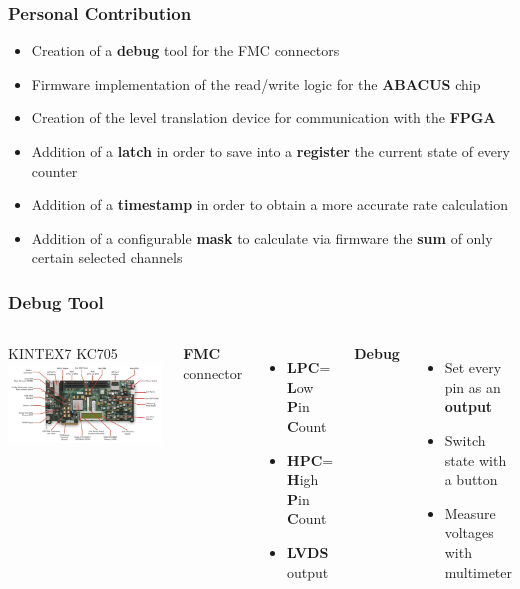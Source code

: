 \documentclass[aspectratio=169]{beamer}
\begin{document}
	
	\begin{frame}
	\frametitle{Personal Contribution}
	\begin{itemize}
		\item {\color{green} Creation of a \textbf{debug} tool for the FMC connectors}
		\item {\color{green} Firmware implementation of the read/write logic for the \textbf{ABACUS} chip}
		\item {\color{green} Creation of the level translation device for communication with the \textbf{FPGA}}
		\item {\color{orange} Addition of a \textbf{latch} in order to save into a \textbf{register} the current state of every counter}
		\item {\color{orange} Addition of a \textbf{timestamp} in order to obtain a more accurate rate calculation}
		\item {\color{orange} Addition of a configurable \textbf{mask} to calculate via firmware the \textbf{sum} of only certain selected channels}
	\end{itemize}
	\end{frame}
	
	\begin{frame}
		\frametitle{Debug Tool}
		\begin{columns}
			\column{0.5 \textwidth}
			\begin{center}
				{\color{blue} KINTEX7 KC705}
				\includegraphics[width=1.0 \textwidth]{IMG/KC705.PNG}
			\end{center}
			\column{0.5 \textwidth}
			\textbf{FMC} connector
			\begin{itemize}
				\item \textbf{LPC}= \textbf{L}ow \textbf{P}in \textbf{C}ount
				\item \textbf{HPC}= \textbf{H}igh \textbf{P}in \textbf{C}ount
				\item \textbf{LVDS} output 
			\end{itemize}
			\textbf{Debug}
			\begin{itemize}
				\item Set every pin as an \textbf{output}
				\item Switch state with a button
				\item Measure voltages with multimeter
			\end{itemize}
		\end{columns}
	\end{frame}
\end{document}
